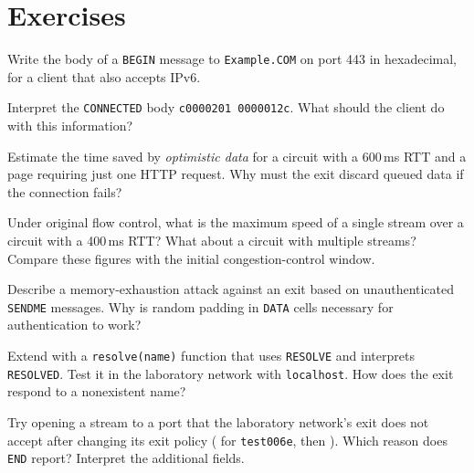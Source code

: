 \section*{Exercises}

\begin{esercizio}[1]\label{es:11-begin}
Write the body of a \texttt{BEGIN} message to \texttt{Example.COM} on port 443 in hexadecimal, for a client that also accepts IPv6.
\end{esercizio}

\begin{esercizio}[1]\label{es:11-connected}
Interpret the \texttt{CONNECTED} body \texttt{c0000201 0000012c}. What should the client do with this information?
\end{esercizio}

\begin{esercizio}[1]\label{es:11-optimistic}
Estimate the time saved by \emph{optimistic data} for a circuit with a 600\,ms RTT and a page requiring just one HTTP request. Why must the exit discard queued data if the connection fails?
\end{esercizio}

\begin{esercizio}[2]\label{es:11-velocita}
Under original flow control, what is the maximum speed of a single stream over a circuit with a 400\,ms RTT? What about a circuit with multiple streams? Compare these figures with the initial congestion-control window.
\end{esercizio}

\begin{esercizio}[2]\label{es:11-sendme-falso}
Describe a memory-exhaustion attack against an exit based on unauthenticated \texttt{SENDME} messages. Why is random padding in \texttt{DATA} cells necessary for authentication to work?
\end{esercizio}

\begin{esercizio}[2]\label{es:11-resolve}
Extend  with a \texttt{resolve(name)} function that uses \texttt{RESOLVE} and interprets \texttt{RESOLVED}. Test it in the laboratory network with \texttt{localhost}. How does the exit respond to a nonexistent name?
\end{esercizio}

\begin{esercizio}[3]\label{es:11-policy}
Try opening a stream to a port that the laboratory network's exit does not accept after changing its exit policy ( for \texttt{test006e}, then ). Which reason does \texttt{END} report? Interpret the additional fields.
\end{esercizio}

